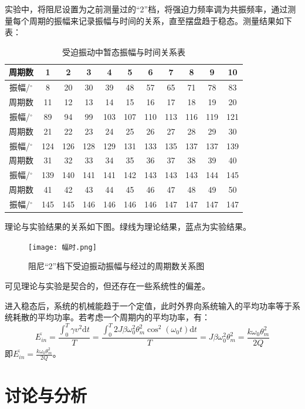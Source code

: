 \documentclass[11pt,a4paper,UTF8]{ctexart}
\begin{document}
实验中，将阻尼设置为之前测量过的“2”档，将强迫力频率调为共振频率，通过测量每个周期的振幅来记录振幅与时间的关系，直至摆盘趋于稳态。测量结果如下表：
\begin{table}[H]
	\centering\caption{受迫振动中暂态振幅与时间关系表}
	\small
	\begin{tabularx}{.72\textwidth}{ccccccccccc}
	\toprule
	周期数 & 1 & 2 & 3 & 4 & 5 & 6 & 7 & 8 & 9 & 10 \\ \hline
	振幅/$^{\circ}$ & 8 & 20 & 30 & 39 & 48 & 57 & 65 & 71 & 78 & 83 \\ \midrule
	周期数 & 11 & 12 & 13 & 14 & 15 & 16 & 17 & 18 & 19 & 20 \\ \hline
	振幅/$^{\circ}$ & 89 & 94 & 99 & 103 & 107 & 110 & 113 & 116 & 119 & 121 \\ \midrule
	周期数 & 21 & 22 & 23 & 24 & 25 & 26 & 27 & 28 & 29 & 30 \\ \hline
	振幅/$^{\circ}$ & 124 & 126 & 128 & 129 & 131 & 133 & 135 & 137 & 137 & 139 \\ \midrule
	周期数 & 31 & 32 & 33 & 34 & 35 & 36 & 37 & 38 & 39 & 40 \\ \hline
	振幅/$^{\circ}$ & 139 & 140 & 141 & 141 & 142 & 143 & 143 & 143 & 144 & 145 \\ \midrule
	周期数 & 41 & 42 & 43 & 44 & 45 & 46 & 47 & 48 & 49 & 50 \\ \hline
	振幅/$^{\circ}$ & 145 & 145 & 146 & 146 & 146 & 146 & 147 & 147 & 147 & 147 \\ 
	\bottomrule
	\end{tabularx}
\end{table}

理论与实验结果的关系如下图。绿线为理论结果，蓝点为实验结果。

\begin{figure}[H]
	\centering
	\texttt{[image: 幅时.png]}
	\caption{阻尼“2”档下受迫振动振幅与经过的周期数关系图}
\end{figure}

可见理论与实验是契合的，但还存在一些系统性的偏差。

进入稳态后，系统的机械能趋于一个定值，此时外界向系统输入的平均功率等于系统耗散的平均功率。若考虑一个周期内的平均功率，有：
	\[\overline{E_{in}}=\frac{\int_{0}^{T}{\gamma v^2\mathrm{d}t}}{T}=\frac{\int_{0}^{T}{2J\beta\omega_0^2\theta_m^2\cos^2(\omega_0t)\mathrm{d}t}}{T}=J\beta\omega_0^2\theta_m^2=\frac{k\omega_0\theta_m^2}{2Q}\tag{18}\]
即$\boxed{\overline{E_{in}}=\frac{k\omega_0\theta_m^2}{2Q}}$。

\section{讨论与分析}
\end{document}
